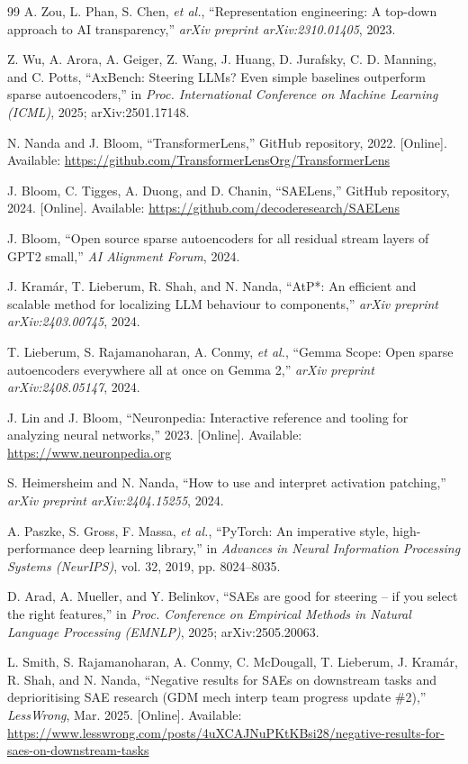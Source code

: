 \begin{thebibliography}{99}
 A. Zou, L. Phan, S. Chen, \textit{et al.}, ``Representation engineering: A top-down approach to AI transparency,'' \textit{arXiv preprint arXiv:2310.01405}, 2023.

 Z. Wu, A. Arora, A. Geiger, Z. Wang, J. Huang, D. Jurafsky, C. D. Manning, and C. Potts, ``AxBench: Steering LLMs? Even simple baselines outperform sparse autoencoders,'' in \textit{Proc. International Conference on Machine Learning (ICML)}, 2025; arXiv:2501.17148.

 N. Nanda and J. Bloom, ``TransformerLens,'' GitHub repository, 2022. [Online]. Available: \url{https://github.com/TransformerLensOrg/TransformerLens}

 J. Bloom, C. Tigges, A. Duong, and D. Chanin, ``SAELens,'' GitHub repository, 2024. [Online]. Available: \url{https://github.com/decoderesearch/SAELens}

 J. Bloom, ``Open source sparse autoencoders for all residual stream layers of GPT2 small,'' \textit{AI Alignment Forum}, 2024.

 J. Kram\'ar, T. Lieberum, R. Shah, and N. Nanda, ``AtP*: An efficient and scalable method for localizing LLM behaviour to components,'' \textit{arXiv preprint arXiv:2403.00745}, 2024.

 T. Lieberum, S. Rajamanoharan, A. Conmy, \textit{et al.}, ``Gemma Scope: Open sparse autoencoders everywhere all at once on Gemma 2,'' \textit{arXiv preprint arXiv:2408.05147}, 2024.

 J. Lin and J. Bloom, ``Neuronpedia: Interactive reference and tooling for analyzing neural networks,'' 2023. [Online]. Available: \url{https://www.neuronpedia.org}

 S. Heimersheim and N. Nanda, ``How to use and interpret activation patching,'' \textit{arXiv preprint arXiv:2404.15255}, 2024.

 A. Paszke, S. Gross, F. Massa, \textit{et al.}, ``PyTorch: An imperative style, high-performance deep learning library,'' in \textit{Advances in Neural Information Processing Systems (NeurIPS)}, vol. 32, 2019, pp. 8024--8035.

 D. Arad, A. Mueller, and Y. Belinkov, ``SAEs are good for steering -- if you select the right features,'' in \textit{Proc. Conference on Empirical Methods in Natural Language Processing (EMNLP)}, 2025; arXiv:2505.20063.

 L. Smith, S. Rajamanoharan, A. Conmy, C. McDougall, T. Lieberum, J. Kram\'ar, R. Shah, and N. Nanda, ``Negative results for SAEs on downstream tasks and deprioritising SAE research (GDM mech interp team progress update \#2),'' \textit{LessWrong}, Mar. 2025. [Online]. Available: \url{https://www.lesswrong.com/posts/4uXCAJNuPKtKBsi28/negative-results-for-saes-on-downstream-tasks}


\end{thebibliography}
